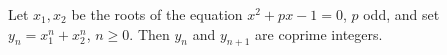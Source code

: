 Let $x_1, x_2$ be the roots of the equation $x^2 + px - 1 = 0$, $p$ odd, and set $y_n = x_1^n + x_2^n$, $n \geq 0$. Then $y_n$ and $y_{n+1}$ are coprime integers.

